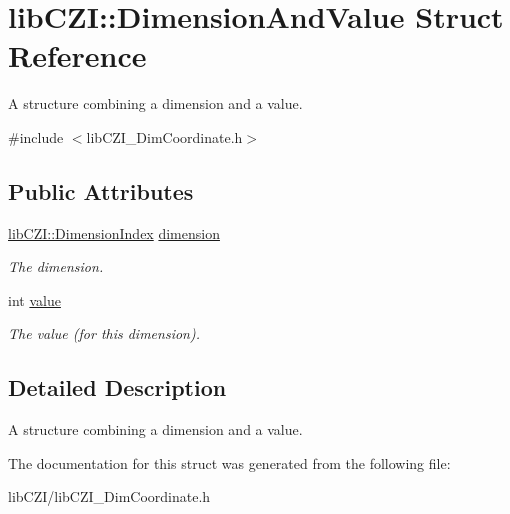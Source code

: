 \hypertarget{structlib_c_z_i_1_1_dimension_and_value}{}\section{lib\+C\+ZI\+:\+:Dimension\+And\+Value Struct Reference}
\label{structlib_c_z_i_1_1_dimension_and_value}


A structure combining a dimension and a value.  




{\ttfamily \#include $<$lib\+C\+Z\+I\+\_\+\+Dim\+Coordinate.\+h$>$}

\subsection*{Public Attributes}
\begin{DoxyCompactItemize}
\item 
\mbox{\label{structlib_c_z_i_1_1_dimension_and_value_a0274b97af7cdb3f56231868fb22e92b1}} 
\hyperlink{namespacelib_c_z_i_a55049658acf59d0eddfaebcad16df424}{lib\+C\+Z\+I\+::\+Dimension\+Index} \hyperlink{structlib_c_z_i_1_1_dimension_and_value_a0274b97af7cdb3f56231868fb22e92b1}{dimension}
\begin{DoxyCompactList}\small\item\em The dimension. \end{DoxyCompactList}\item 
\mbox{\label{structlib_c_z_i_1_1_dimension_and_value_a297b6a1b603c8e8e5ae77d271e93ea15}} 
int \hyperlink{structlib_c_z_i_1_1_dimension_and_value_a297b6a1b603c8e8e5ae77d271e93ea15}{value}
\begin{DoxyCompactList}\small\item\em The value (for this dimension). \end{DoxyCompactList}\end{DoxyCompactItemize}


\subsection{Detailed Description}
A structure combining a dimension and a value. 

The documentation for this struct was generated from the following file\+:\begin{DoxyCompactItemize}
\item 
lib\+C\+Z\+I/lib\+C\+Z\+I\+\_\+\+Dim\+Coordinate.\+h\end{DoxyCompactItemize}
